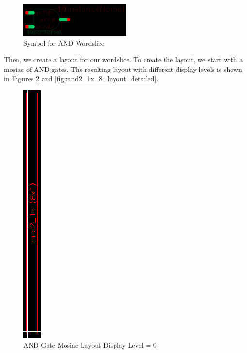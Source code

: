 \documentclass{article}
\begin{document}
	\begin{figure}[H]
		\centerline{\includegraphics[width=0.5\textwidth]{and2_1x_8_symbol.png}}
		\caption{Symbol for AND Wordslice}
		\label{fig::and2_1x_8_symbol}
	\end{figure}
	
	\noindent Then, we create a layout for our wordslice. To create the layout, we start with a mosiac of AND gates. The resulting layout with different display levels is shown in Figures \ref{fig::and2_1x_8_layout_mosiac_overview} and \ref{fig::and2_1x_8_layout_detailed}.
	
	\begin{figure}[H]
		\centerline{\includegraphics[height=0.8\textwidth, angle=270]{and2_1x_8_layout_mosiac_overview.png}}
		\caption{AND Gate Mosiac Layout Display Level = 0}
		\label{fig::and2_1x_8_layout_mosiac_overview}
	\end{figure}
	
\end{document}
